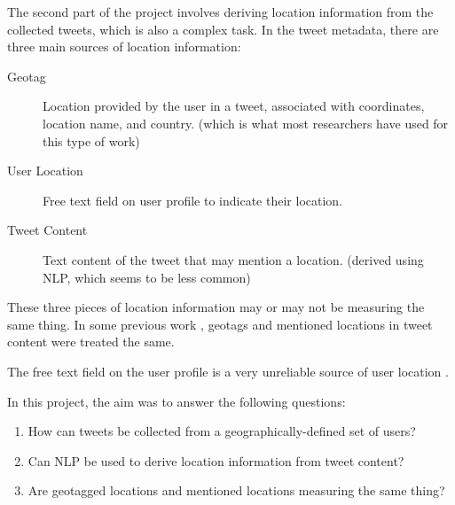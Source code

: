 The second part of the project involves deriving location information from the collected tweets, which is also a complex task. In the tweet metadata, there are three main sources of location information:
\begin{description}
    \item[Geotag] Location provided by the user in a tweet, associated with coordinates, location name, and country. (which is what most researchers have used for this type of work)
    \item[User Location] Free text field on user profile to indicate their location.
    \item[Tweet Content] Text content of the tweet that may mention a location. (derived using NLP, which seems to be less common)
\end{description}

These three pieces of location information may or may not be measuring the same thing. In some previous work \cite{wang_enhancing_2019}, geotags and mentioned locations in tweet content were treated the same.

The free text field on the user profile is a very unreliable source of user location \cite{hecht_tweets_2011}.

In this project, the aim was to answer the following questions:
\begin{enumerate}
    \item How can tweets be collected from a geographically-defined set of users?
    \item Can NLP be used to derive location information from tweet content? 
    \item Are geotagged locations and mentioned locations measuring the same thing?
\end{enumerate}



